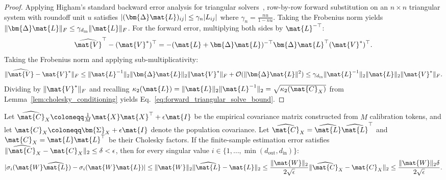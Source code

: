 \begin{proof}
Applying Higham's standard backward error analysis for triangular solvers~\cite{higham2002accuracy}, row-by-row forward substitution on an $n \times n$ triangular system with roundoff unit $u$ satisfies $|(\bm{\Delta}\mat{L})_{ij}| \le \gamma_n |L_{ij}|$ where $\gamma_n = \frac{n u}{1 - n u}$. Taking the Frobenius norm yields $\|\bm{\Delta}\mat{L}\|_F \le \gamma_{d_{\text{in}}} \|\mat{L}\|_F$.
For the forward error, multiplying both sides by $\mat{L}^{-\top}$:
\begin{equation}
\widehat{\mat{V}}^\top - (\mat{V}^*)^\top = -(\mat{L} + \bm{\Delta}\mat{L})^{-\top} \bm{\Delta}\mat{L}^\top (\mat{V}^*)^\top.
\end{equation}
Taking the Frobenius norm and applying sub-multiplicativity:
\begin{equation}
\|\widehat{\mat{V}} - \mat{V}^*\|_F \le \|\mat{L}^{-1}\|_2 \|\bm{\Delta}\mat{L}\|_2 \|\mat{V}^*\|_F + \mathcal{O}(\|\bm{\Delta}\mat{L}\|^2) \le \gamma_{d_{\text{in}}} \|\mat{L}^{-1}\|_2 \|\mat{L}\|_2 \|\mat{V}^*\|_F.
\end{equation}
Dividing by $\|\mat{V}^*\|_F$ and recalling $\kappa_2(\mat{L}) = \|\mat{L}\|_2 \|\mat{L}^{-1}\|_2 = \sqrt{\kappa_2(\mat{C}_X)}$ from Lemma~\ref{lem:cholesky_conditioning} yields Eq.~\eqref{eq:forward_triangular_solve_bound}.
\end{proof}

\begin{lemma}
\label{lem:weyl_sample_covariance}
Let $\widehat{\mat{C}}_X \coloneqq \frac{1}{M}\mat{X}\mat{X}^\top + \epsilon \mat{I}$ be the empirical covariance matrix constructed from $M$ calibration tokens, and let $\mat{C}_X \coloneqq \bm{\Sigma}_X + \epsilon \mat{I}$ denote the population covariance.
Let $\widehat{\mat{C}}_X = \widehat{\mat{L}}\widehat{\mat{L}}^\top$ and $\mat{C}_X = \mat{L}\mat{L}^\top$ be their Cholesky factors.
If the finite-sample estimation error satisfies $\|\widehat{\mat{C}}_X - \mat{C}_X\|_2 \le \delta < \epsilon$, then for every singular value $i \in \{1, \dots, \min(d_{\text{out}}, d_{\text{in}})\}$:
\begin{equation}
|\sigma_i(\mat{W} \widehat{\mat{L}}) - \sigma_i(\mat{W} \mat{L})| \le \|\mat{W}\|_2 \|\widehat{\mat{L}} - \mat{L}\|_2 \le \frac{\|\mat{W}\|_2}{2\sqrt{\epsilon}} \|\widehat{\mat{C}}_X - \mat{C}_X\|_2 \le \frac{\|\mat{W}\|_2 \delta}{2\sqrt{\epsilon}}.
\label{eq:weyl_sample_covariance_bound}
\end{equation}
\end{lemma}

